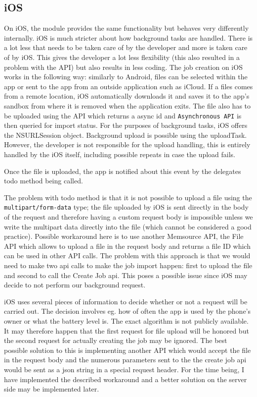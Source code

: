 \subsection{iOS}
On iOS, the module provides the same functionality but behaves very differently internally. iOS is much stricter about how background tasks are handled. There is a lot less that needs to be taken care of by the developer and more is taken care of by iOS. This gives the developer a lot less flexibility (this also resulted in a problem with the API) but also results in less coding. The job creation on iOS works in the following way: similarly to Android, files can be selected within the app or sent to the app from an outside application such as iCloud. If a files comes from a remote location, iOS automatically downloads it and saves it to the app’s sandbox from where it is removed when the application exits. The file also has to be uploaded using the API which returns a async id and \texttt{Asynchronous API} is then queried for import status. For the purposes of background tasks, iOS offers the NSURLSession object. Background upload is possible using the uploadTask. However, the developer is not responsible for the upload handling, this is entirely handled by the iOS itself, including possible repeats in case the upload fails. 


Once the file is uploaded, the app is notified about this event by the delegates todo method being called. 


The problem with todo method is that it is not possible to upload a file using the \texttt{multipart/form-data} type; the file uploaded by iOS is sent directly in the body of the request and therefore having a custom request body is impossible unless we write the multipart data directly into the file (which cannot be considered a good practice). Possible workaround here is to use another Memsource API, the File API which allows to upload a file in the request body and returns a file ID which can be used in other API calls. The problem with this approach is that we would need to make two api calls to make the job import happen: first to upload the file and second to call the Create Job api. This poses a possible issue since iOS may decide to not perform our background request. 

iOS uses several pieces of information to decide whether or not a request will be carried out. The decision involves eg. how of often the app is used by the phone's owner or what the battery level is. The exact algorithm is not publicly available. It may therefore happen that the first request for file upload will be honored but the second request for actually creating the job may be ignored. The best possible solution to this is implementing another API which would accept the file in the request body and the numerous parameters sent to the the create job api would be sent as a json string in a special request header. For the time being, I have implemented the described workaround and a better solution on the server side may be implemented later.


